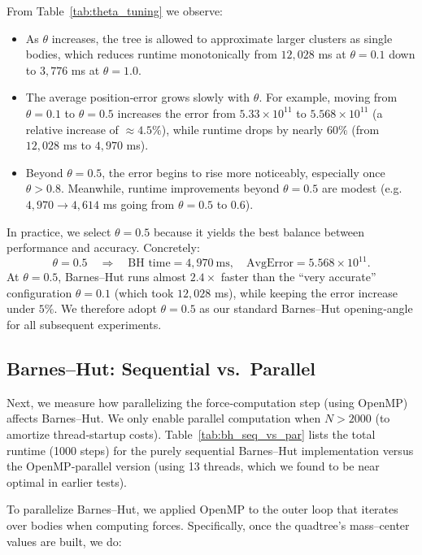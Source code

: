 \documentclass{article}
\begin{document}
\noindent From Table~\ref{tab:theta_tuning} we observe:

\begin{itemize}
  \item As \(\theta\) increases, the tree is allowed to approximate larger clusters as single bodies, which reduces runtime monotonically from \(12{,}028\) ms at \(\theta=0.1\) down to \(3{,}776\) ms at \(\theta=1.0\).
  \item The average position‐error grows slowly with \(\theta\).  For example, moving from \(\theta=0.1\) to \(\theta=0.5\) increases the error from \(5.33\times10^{11}\) to \(5.568\times10^{11}\) (a relative increase of \(\approx4.5\%\)), while runtime drops by nearly \(60\%\) (from \(12{,}028\) ms to \(4{,}970\) ms).
  \item Beyond \(\theta=0.5\), the error begins to rise more noticeably, especially once \(\theta>0.8\).  Meanwhile, runtime improvements beyond \(\theta=0.5\) are modest (e.g.\ \(4{,}970\to4{,}614\) ms going from \(\theta=0.5\) to \(0.6\)).
\end{itemize}

\noindent In practice, we select \(\theta=0.5\) because it yields the best balance between performance and accuracy.  Concretely:
\[
  \theta = 0.5 
  \quad\Longrightarrow\quad
  \text{BH time} = 4{,}970~\text{ms},\quad
  \text{AvgError} = 5.568\times10^{11}.
\]
At \(\theta=0.5\), Barnes–Hut runs almost \(2.4\times\) faster than the “very accurate” configuration \(\theta=0.1\) (which took \(12{,}028\) ms), while keeping the error increase under \(5\%\).  We therefore adopt \(\theta=0.5\) as our standard Barnes–Hut opening‐angle for all subsequent experiments.

\subsection{Barnes–Hut: Sequential vs.\ Parallel}

Next, we measure how parallelizing the force‐computation step (using OpenMP) affects Barnes–Hut.  We only enable parallel computation when $N>2000$ (to amortize thread‐startup costs).  Table~\ref{tab:bh_seq_vs_par} lists the total runtime (1000 steps) for the purely sequential Barnes–Hut implementation versus the OpenMP‐parallel version (using 13 threads, which we found to be near optimal in earlier tests).

\noindent
To parallelize Barnes–Hut, we applied OpenMP to the outer loop that iterates over bodies when computing forces. Specifically, once the quadtree’s mass–center values are built, we do:
\end{document}
